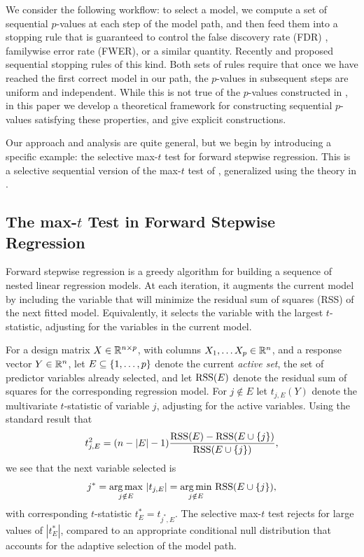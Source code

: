 \documentclass{article}
\begin{document}
We consider the following workflow: to select a model, we compute a set of sequential $p$-values at each step of the model path, and then feed them into a stopping rule that is guaranteed to control the false discovery rate (FDR) \citep{benjamini1995controlling}, familywise error rate (FWER), or a similar quantity. Recently \citet{gsell2013sequential} and \citet{li2015accumulation} proposed sequential stopping rules of this kind. Both sets of rules require that once we have reached the first correct model in our path, the $p$-values in subsequent steps are uniform and independent. While this is not true of the $p$-values constructed in \citet{tibshirani2014exact}, in this paper we develop a theoretical framework for constructing sequential $p$-values satisfying these properties, and give explicit constructions.

Our approach and analysis are quite general, but we begin by introducing a specific example: the selective max-$t$ test for forward stepwise regression.  This is a selective sequential version of the max-$t$ test of \citet{buja2014}, generalized using the theory in \citet{fithian2014optimal}.

\subsection{The max-$t$ Test in Forward Stepwise Regression}

Forward stepwise regression is a greedy algorithm for building a sequence of nested linear regression models. At each iteration, it augments the current model by including the variable that will minimize the residual sum of squares (RSS) of the next fitted model. Equivalently, it selects the variable with the largest $t$-statistic, adjusting for the variables in the current model.

For a design matrix $X\in \mathbb{R}^{n\times p}$, with columns $X_1,\ldots X_p \in \mathbb{R}^n$, and a response vector $Y\in \mathbb{R}^n$, let $E \subseteq \{1, \ldots, p\}$ denote the current {\em active set}, the set of predictor variables already selected, and let $\text{RSS}(E)$ denote the residual sum of squares for the corresponding regression model. For $j\notin E$ let $t_{j,E}(Y)$ denote the multivariate $t$-statistic of variable $j$, adjusting for the active variables. Using the standard result that
\begin{equation*}
t_{j,E}^2 = (n-|E|-1) \frac{\text{RSS}(E) - \text{RSS}(E \cup \{j\})}{\text{RSS}(E \cup \{j\})},
\end{equation*}
we see that the next variable selected is 
\begin{equation*}
j^* = \operatorname*{arg\,max}_{j\notin E} \, |t_{j,E}| = \operatorname*{arg\,min}_{j\notin E} \, \text{RSS}(E \cup \{j\}), 
\end{equation*}
with corresponding $t$-statistic $t_E^* = t_{j^*,E}$. The selective max-$t$ test rejects for large values of $|t_E^*|$, compared to an appropriate conditional null distribution that accounts for the adaptive selection of the model path.
\end{document}
